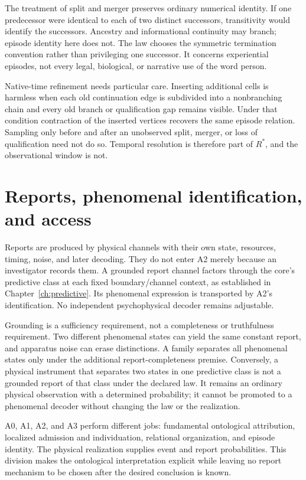 The treatment of split and merger preserves ordinary numerical identity. If one predecessor were identical to each of two distinct successors, transitivity would identify the successors. Ancestry and informational continuity may branch; episode identity here does not. The law chooses the symmetric termination convention rather than privileging one successor. It concerns experiential episodes, not every legal, biological, or narrative use of the word person.

Native-time refinement needs particular care. Inserting additional cells is harmless when each old continuation edge is subdivided into a nonbranching chain and every old branch or qualification gap remains visible. Under that condition contraction of the inserted vertices recovers the same episode relation. Sampling only before and after an unobserved split, merger, or loss of qualification need not do so. Temporal resolution is therefore part of $R^\ast$, and the observational window is not.


\section{Reports, phenomenal identification, and access}\label{section:spc:reports-are-physical-instruments}
Reports are produced by physical channels with their own state, resources, timing, noise, and later decoding. They do not enter A2 merely because an investigator records them. A grounded report channel factors through the core's predictive class at each fixed boundary/channel context, as established in Chapter~\ref{ch:predictive}. Its phenomenal expression is transported by A2's identification. No independent psychophysical decoder remains adjustable.

Grounding is a sufficiency requirement, not a completeness or truthfulness requirement. Two different phenomenal states can yield the same constant report, and apparatus noise can erase distinctions. A family separates all phenomenal states only under the additional report-completeness premise. Conversely, a physical instrument that separates two states in one predictive class is not a grounded report of that class under the declared law. It remains an ordinary physical observation with a determined probability; it cannot be promoted to a phenomenal decoder without changing the law or the realization.

A0, A1, A2, and A3 perform different jobs: fundamental ontological attribution, localized admission and individuation, relational organization, and episode identity. The physical realization supplies event and report probabilities. This division makes the ontological interpretation explicit while leaving no report mechanism to be chosen after the desired conclusion is known.

